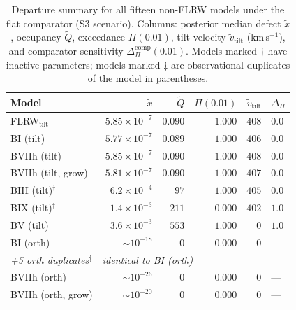 




\begin{table}[t]
\centering
\caption{Departure summary for all fifteen non-FLRW models
  under the flat comparator (S3 scenario).  Columns:
  posterior median defect $\tilde{x}$, occupancy $\tilde{Q}$,
  exceedance $\Pi(0.01)$, tilt velocity
  $\tilde{v}_{\mathrm{tilt}}$ (km\,s$^{-1}$), and
  comparator sensitivity $\Delta_\Pi^{\mathrm{comp}}(0.01)$.
  Models marked $\dagger$ have inactive parameters;
  models marked $\ddagger$ are observational duplicates
  of the model in parentheses.}
\label{tab:departure_summary}
\footnotesize
\begin{tabular}{lrrrrl}
\toprule
Model & $\tilde{x}$ & $\tilde{Q}$ & $\Pi(0.01)$ &
  $\tilde{v}_{\mathrm{tilt}}$ & $\Delta_\Pi$ \\
\midrule
FLRW$_{\mathrm{tilt}}$ & $5.85 \times 10^{-7}$ & $0.090$ & $1.000$ & $408$ & $0.0$ \\
BI (tilt)               & $5.77 \times 10^{-7}$ & $0.089$ & $1.000$ & $406$ & $0.0$ \\
BVIIh (tilt)            & $5.85 \times 10^{-7}$ & $0.090$ & $1.000$ & $408$ & $0.0$ \\
BVIIh (tilt, grow)      & $5.81 \times 10^{-7}$ & $0.090$ & $1.000$ & $407$ & $0.0$ \\
BIII (tilt)$^\dagger$   & $6.2 \times 10^{-4}$  & $97$    & $1.000$ & $405$ & $0.0$ \\
BIX (tilt)$^\dagger$    & $-1.4 \times 10^{-3}$ & $-211$  & $0.000$ & $402$ & $1.0$ \\
BV (tilt)               & $3.6 \times 10^{-3}$  & $553$   & $1.000$ & $0$   & $1.0$ \\
BI (orth)               & $\sim 10^{-18}$       & $0$     & $0.000$ & $0$   & --- \\
\emph{+5 orth duplicates}$^\ddagger$ & \multicolumn{5}{l}{\emph{identical to BI (orth)}} \\
BVIIh (orth)            & $\sim 10^{-26}$       & $0$     & $0.000$ & $0$   & --- \\
BVIIh (orth, grow)      & $\sim 10^{-20}$       & $0$     & $0.000$ & $0$   & --- \\
\bottomrule
\end{tabular}
\end{table}

